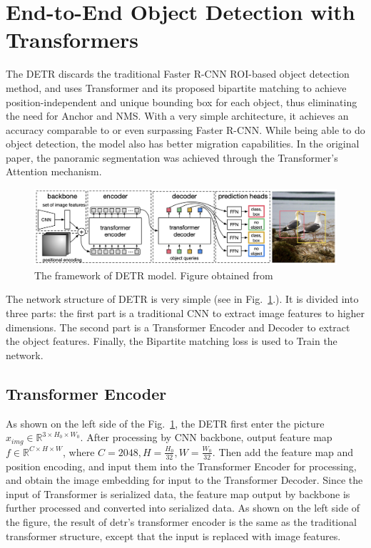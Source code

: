 \section{End-to-End Object Detection with Transformers}
The DETR discards the traditional Faster R-CNN ROI-based object detection method, and uses Transformer and its proposed bipartite matching to achieve position-independent and unique bounding box for each object, thus eliminating the need for Anchor and NMS. With a very simple architecture, it achieves an accuracy comparable to or even surpassing Faster R-CNN. While being able to do object detection, the model also has better migration capabilities. In the original paper, the panoramic segmentation was achieved through the Transformer's Attention mechanism. 

\begin{figure}[!htbp]
	\centering
	\includegraphics[width = 1 \textwidth]{figures/DETR.png}
	\caption[The framework of DETR model]
	{ The framework of DETR model. Figure obtained from ~\cite{carion2020end}}
	\label{fig:detr}
\end{figure}

The network structure of DETR is very simple (see in Fig.~\ref{fig:detr}.). It is divided into three parts: the first part is a traditional CNN to extract image features to higher dimensions. The second part is a Transformer Encoder and Decoder to extract the object features. Finally, the Bipartite matching loss is used to Train the network. 

\subsection{Transformer Encoder}

As shown on the left side of the Fig.~\ref{fig:detr}, the DETR first enter the picture $ x_{img} \in  \mathbb{R} ^{3\times H_0\times W_0} $. After processing by CNN backbone, output feature map $ f \in \mathbb{R} ^{C\times H\times W } $, where $ C = 2048, H=\frac{H_0}{32}, W=\frac{W_0}{32}  $. Then add the feature map and position encoding, and input them into the Transformer Encoder for processing, and obtain the image embedding for input to the Transformer Decoder. Since the input of Transformer is serialized data, the feature map output by backbone is further processed and converted into serialized data. 
As shown on the left side of the figure, the result of detr's transformer encoder is the same as the traditional transformer structure, except that the input is replaced with image features.

